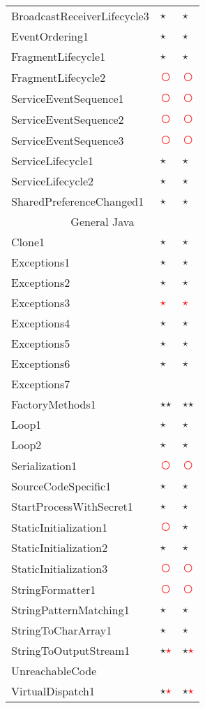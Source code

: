 \documentclass[../draft.tex]{subfiles}
\newcommand{\fp}{\textcolor{white}{\textcircled{\textcolor{red}{$\star$}}}}
\newcommand{\fn}{\textcolor{red}{\textcircled{ }}}
\newcommand{\tp}[0]{\textcircled{$\star$}}
\newcommand{\tsub}[1]{\multicolumn{3}{c}{#1}\\\hline}
\begin{document}
\begin{longtable}{l | l | l}
        BroadcastReceiverLifecycle3 & \tp & \tp\\
        EventOrdering1 & \tp & \tp\\
        FragmentLifecycle1 & \tp & \tp\\
        FragmentLifecycle2 & \fn & \fn\\
        ServiceEventSequence1 & \fn & \fn\\
        ServiceEventSequence2 & \fn & \fn\\
        ServiceEventSequence3 & \fn & \fn\\
        ServiceLifecycle1 & \tp & \tp\\
        ServiceLifecycle2 & \tp & \tp\\
        SharedPreferenceChanged1 & \tp & \tp\\
        \hline
        \tsub{General Java}
        Clone1 & \tp & \tp\\
        Exceptions1 & \tp & \tp \\
        Exceptions2 & \tp & \tp\\
        Exceptions3 & \fp & \fp \\
        Exceptions4 & \tp & \tp \\
        Exceptions5 & \tp & \tp \\
        Exceptions6 & \tp & \tp\\
        Exceptions7 & &\\
        FactoryMethods1 & \tp \tp & \tp \tp\\
        Loop1 & \tp & \tp\\
        Loop2 & \tp & \tp\\
        Serialization1 & \fn & \fn\\
        SourceCodeSpecific1 & \tp & \tp\\
        StartProcessWithSecret1 & \tp & \tp\\
        StaticInitialization1 & \fn & \tp\\
        StaticInitialization2 & \tp & \tp\\
        StaticInitialization3 & \fn & \fn\\
        StringFormatter1 & \fn & \fn\\
        StringPatternMatching1 & \tp & \tp\\
        StringToCharArray1 & \tp & \tp\\
        StringToOutputStream1 & \tp \fp & \tp \fp\\
        UnreachableCode & &\\
        VirtualDispatch1 & \tp \fp & \tp \fp\\

\end{longtable}
\end{document}
